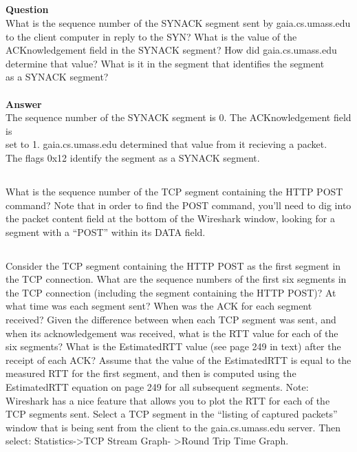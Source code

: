 \documentclass[12pt]{article}
\begin{document}
\tiny

\normalsize

\subsection{}
\textbf{Question}\\
What is the sequence number of the SYNACK segment sent by gaia.cs.umass.edu
to the client computer in reply to the SYN? What is the value of the
ACKnowledgement field in the SYNACK segment? How did gaia.cs.umass.edu
determine that value? What is it in the segment that identifies the segment \\
as a SYNACK segment?\\\\
\noindent\textbf{Answer}\\
The sequence number of the SYNACK segment is 0. The ACKnowledgement field is \\
set to 1. gaia.cs.umass.edu determined that value from it recieving a packet.\\
The flags 0x12 identify the segment as a SYNACK segment.

\tiny

\normalsize

\subsection{}
What is the sequence number of the TCP segment containing the HTTP POST
command? Note that in order to find the POST command, you’ll need to dig into
the packet content field at the bottom of the Wireshark window, looking for a
segment with a “POST” within its DATA field.

\subsection{}
Consider the TCP segment containing the HTTP POST as the first segment in the
TCP connection. What are the sequence numbers of the first six segments in the
TCP connection (including the segment containing the HTTP POST)? At what
time was each segment sent? When was the ACK for each segment received?
Given the difference between when each TCP segment was sent, and when its
acknowledgement was received, what is the RTT value for each of the six
segments? What is the EstimatedRTT value (see page 249 in text) after the
receipt of each ACK? Assume that the value of the EstimatedRTT is equal to
the measured RTT for the first segment, and then is computed using the
EstimatedRTT equation on page 249 for all subsequent segments.
Note: Wireshark has a nice feature that allows you to plot the RTT for
each of the TCP segments sent. Select a TCP segment in the “listing of
captured packets” window that is being sent from the client to the
gaia.cs.umass.edu server. Then select: Statistics->TCP Stream Graph-
>Round Trip Time Graph.
\end{document}

